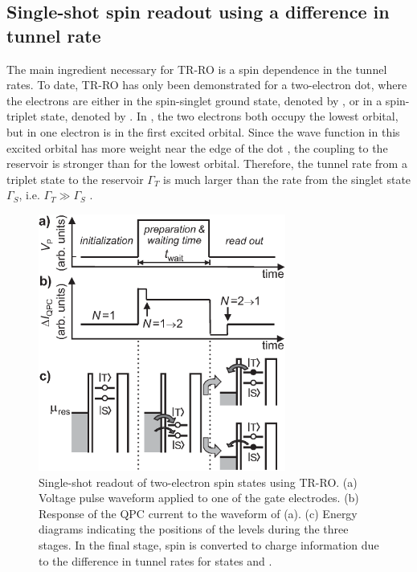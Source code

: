 \documentclass[12pt,aps,nofootinbib]{revtex4-1}
\begin{document}
\subsection{Single-shot spin readout using a difference in tunnel rate}
\label{Subsection:TRRO}
The main ingredient necessary for TR-RO is a spin dependence in
the tunnel rates. To date, TR-RO has only been demonstrated for a two-electron dot, where the electrons are either
in the spin-singlet ground state, denoted by , or in a
spin-triplet state, denoted by . In , the two
electrons both occupy the lowest orbital, but in  one
electron is in the first excited orbital. Since the wave function
in this excited orbital has more weight near the edge of the dot
\cite{kouwenhoven01}, the coupling to the reservoir is stronger than
for the lowest orbital. Therefore, the tunnel rate from a triplet
state to the reservoir $\Gamma_T$ is much larger than the rate
from the singlet state $\Gamma_S$, i.e. $\Gamma_T\gg\Gamma_S$
\cite{RonaldMoriond}.

\begin{figure}[htb]
\includegraphics[width=3.2in, clip=true]{hanson_fig17.eps}
\caption{Single-shot readout of two-electron spin states using
TR-RO. (a) Voltage pulse waveform applied to one of the gate
electrodes. (b) Response of the QPC current to the waveform of
(a). (c) Energy diagrams indicating the positions of the levels
during the three stages. In the final stage, spin is converted to
charge information due to the difference in tunnel rates for
states  and .} \label{Fig:TRROpulse}
\end{figure}
\end{document}
